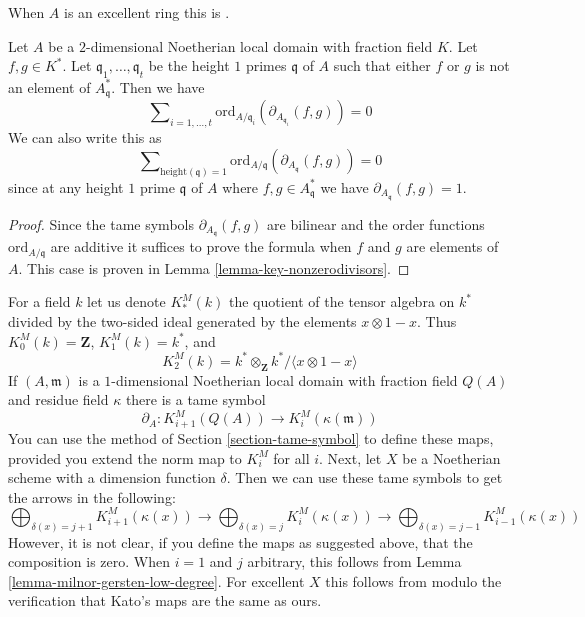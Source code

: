 \begin{lemma}
\label{lemma-milnor-gersten-low-degree}
\begin{reference}
When $A$ is an excellent ring this is \cite[Proposition 1]{Kato-Milnor-K}.
\end{reference}
Let $A$ be a $2$-dimensional Noetherian local domain with fraction field $K$.
Let $f, g \in K^*$.
Let $\mathfrak q_1, \ldots, \mathfrak q_t$ be the height
$1$ primes $\mathfrak q$ of $A$ such that either $f$ or $g$ is not an
element of $A^*_{\mathfrak q}$.
Then we have
$$
\sum\nolimits_{i = 1, \ldots, t}
\text{ord}_{A/\mathfrak q_i}(\partial_{A_{\mathfrak q_i}}(f, g))
=
0
$$
We can also write this as
$$
\sum\nolimits_{\text{height}(\mathfrak q) = 1}
\text{ord}_{A/\mathfrak q}(\partial_{A_{\mathfrak q}}(f, g))
=
0
$$
since at any height $1$ prime $\mathfrak q$
of $A$ where $f, g \in A^*_{\mathfrak q}$
we have $\partial_{A_{\mathfrak q}}(f, g) = 1$.
\end{lemma}

\begin{proof}
Since the tame symbols $\partial_{A_{\mathfrak q}}(f, g)$ are
bilinear and the order functions $\text{ord}_{A/\mathfrak q}$
are additive it suffices to prove the formula when
$f$ and $g$ are elements of $A$. This case is proven in
Lemma \ref{lemma-key-nonzerodivisors}.
\end{proof}

\begin{remark}
\label{remark-gersten-complex-milnor}
For a field $k$ let us denote $K^M_*(k)$ the quotient of
the tensor algebra on $k^*$ divided by the two-sided ideal
generated by the elements $x \otimes 1 - x$. Thus $K^M_0(k) = \mathbf{Z}$,
$K_1^M(k) = k^*$, and
$$
K^M_2(k) = k^* \otimes_\mathbf{Z} k^* / \langle x \otimes 1 - x \rangle
$$
If $(A, \mathfrak m)$ is a $1$-dimensional Noetherian local domain
with fraction field $Q(A)$ and residue field $\kappa$ there is a
tame symbol
$$
\partial_A : K_{i + 1}^M(Q(A)) \to K_i^M(\kappa(\mathfrak m))
$$
You can use the method of Section \ref{section-tame-symbol}
to define these maps, provided you extend the norm map
to $K_i^M$ for all $i$. Next, let $X$ be a Noetherian scheme with a
dimension function $\delta$. Then we can use these tame symbols
to get the arrows in the following:
$$
\bigoplus\nolimits_{\delta(x) = j + 1} K^M_{i + 1}(\kappa(x))
\longrightarrow
\bigoplus\nolimits_{\delta(x) = j} K^M_i(\kappa(x))
\longrightarrow
\bigoplus\nolimits_{\delta(x) = j - 1} K^M_{i - 1}(\kappa(x))
$$
However, it is not clear, if you define the maps as suggested above,
that the composition is zero. When $i = 1$ and $j$ arbitrary, this
follows from Lemma \ref{lemma-milnor-gersten-low-degree}.
For excellent $X$ this follows from \cite{Kato-Milnor-K}
modulo the verification that Kato's maps are the same as ours.
\end{remark}





















